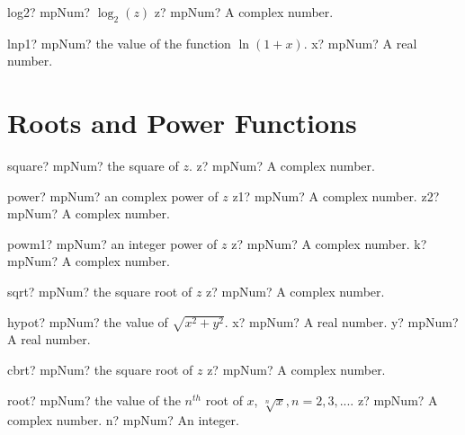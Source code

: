 \documentclass[12pt,a4paper,openany]{book}
\begin{document}
\begin{mpFunctionsExtract}
\mpFunctionOne
{log2? mpNum? $\log_{2}(z)$}
{z? mpNum? A complex number.}
\end{mpFunctionsExtract}

\begin{mpFunctionsExtract}
\mpFunctionOne
{lnp1? mpNum? the value of the function $\ln(1+x)$.}
{x? mpNum? A real number.}
\end{mpFunctionsExtract}

\section{Roots and Power Functions}

\begin{mpFunctionsExtract}
\mpFunctionOne
{square? mpNum? the square of $z$.}
{z? mpNum? A complex number.}
\end{mpFunctionsExtract}

\begin{mpFunctionsExtract}
\mpFunctionTwo
{power? mpNum? an complex power of $z$}
{z1? mpNum? A complex number.}
{z2? mpNum? A complex number.}
\end{mpFunctionsExtract}

\begin{mpFunctionsExtract}
\mpFunctionTwo
{powm1? mpNum? an integer power of $z$}
{z? mpNum? A complex number.}
{k? mpNum?  A complex number.}
\end{mpFunctionsExtract}

\begin{mpFunctionsExtract}
\mpFunctionOne
{sqrt? mpNum? the square root of $z$}
{z? mpNum? A complex number.}
\end{mpFunctionsExtract}

\begin{mpFunctionsExtract}
\mpFunctionTwo
{hypot? mpNum? the value of $\sqrt{x^2+y^2}$.}
{x? mpNum? A real number.}
{y? mpNum? A real number.}
\end{mpFunctionsExtract}

\begin{mpFunctionsExtract}
\mpFunctionOne
{cbrt? mpNum? the square root of $z$}
{z? mpNum? A complex number.}
\end{mpFunctionsExtract}

\begin{mpFunctionsExtract}
\mpFunctionTwo
{root? mpNum? the value of the $n^{th}$ root of $x$, $\sqrt[n]{x}, n=2,3,...$.}
{z? mpNum? A complex number.}
{n? mpNum? An integer.}
\end{mpFunctionsExtract}
\end{document}
